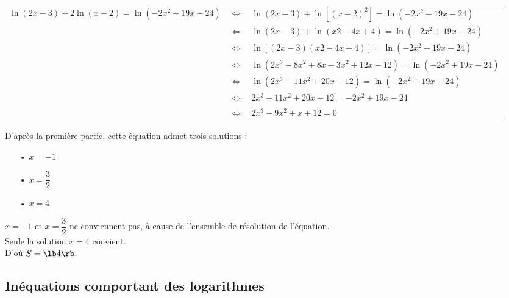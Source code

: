 \begin{tabular}{lll}
$\ln\left(2x-3\right) + 2\ln\left(x-2\right) = \ln\left(-2x^2 + 19x - 24\right)$ & $\Longleftrightarrow$ & $\ln\left(2x-3\right) + \ln\left[\left(x-2\right)^2\right] = \ln\left(-2x^2 + 19x - 24\right) $ \\
& $\Longleftrightarrow$ & $\ln\left(2x-3\right) + \ln\left(x2 -4x + 4\right) = \ln\left(-2x^2 + 19x - 24\right) $ \\
& $\Longleftrightarrow$ & $\ln\left[\left(2x-3\right) \left(x2 -4x + 4\right)\right] = \ln\left(-2x^2 + 19x - 24\right) $ \\
& $\Longleftrightarrow$ & $\ln\left(2x^3 - 8x^2 + 8x - 3x^2 + 12x - 12\right) = \ln\left(-2x^2 + 19x - 24\right) $ \\
& $\Longleftrightarrow$ & $\ln\left(2x^3 - 11x^2 + 20x - 12\right) = \ln\left(-2x^2 + 19x - 24\right) $ \\
& $\Longleftrightarrow$ & $2x^3 - 11x^2 + 20x - 12 = -2x^2 + 19x - 24 $ \\
& $\Longleftrightarrow$ & $2x^3 - 9x^2 + x + 12 = 0$ \\
\end{tabular}

\vspace*{.3cm}

D'après la première partie, cette équation admet trois solutions : \\

\begin{itemize}
\item[•] $x = -1$ \\
\item[•] $x = \dfrac{3}{2}$ \\
\item[•] $x = 4$ \\
\end{itemize}

$x = -1$ et $x= \dfrac{3}{2}$ ne conviennent pas, à cause de l'ensemble de résolution de l'équation. \\ Seule la solution $x = 4$ convient. \\

D'où $ S = \lb 4 \rb$.

\newpage

\vspace*{-2cm}

\subsection{Inéquations comportant des logarithmes}

